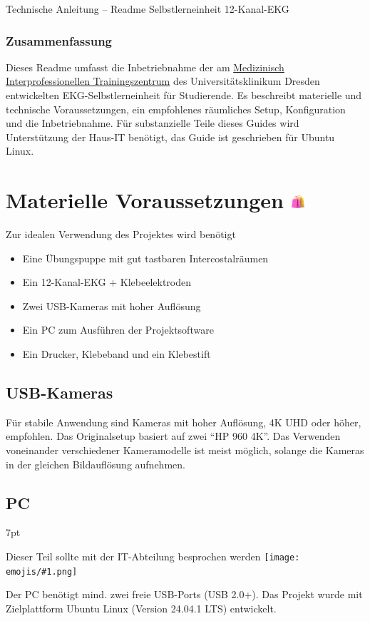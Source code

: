 \documentclass[a4paper, 10pt]{article}
\newcommand{\emoji}[1]{
    \begingroup\normalfont
    \texttt{[image: emojis/\#1.png]}
    \endgroup
}
\newenvironment{tooltip}{%
\small
\vspace*{-4mm}
    \def\FrameCommand{%
    \hspace{1pt}%
    {\color{tooltippipe}\vrule width 0.7mm}%
    {\color{tooltipshade}\vrule width 1.5mm}%
    \colorbox{tooltipshade}%
    }%
    \MakeFramed{\advance\hsize-\width\FrameRestore}%
    \noindent%
    \begin{adjustwidth}{}{7pt}%
    \vspace{2pt}\vspace{2pt}%
}
{%
    \vspace{2pt}\end{adjustwidth}\endMakeFramed%
}
\begin{document}
{ \Huge \noindent Technische Anleitung -- Readme} \newline
{ \LARGE \noindent Selbstlerneinheit 12-Kanal-EKG}

\subsubsection*{Zusammenfassung}
Dieses Readme umfasst die Inbetriebnahme der am \href{https://tu-dresden.de/med/mf/mitz}{Medizinisch Interprofessionellen Trainingszentrum} des Universitätsklinikum Dresden entwickelten EKG-Selbstlerneinheit für Studierende. Es beschreibt materielle und technische Voraussetzungen, ein empfohlenes räumliches Setup, Konfiguration und die Inbetriebnahme.
Für substanzielle Teile dieses Guides wird Unterstützung der Haus-IT benötigt, das Guide ist geschrieben für Ubuntu Linux.

\section{Materielle Voraussetzungen {\includegraphics[height=0.65em]{emojis/shopping-bags.png}}}
\label{sec:prerequisites}
Zur idealen Verwendung des Projektes wird benötigt
\begin{itemize}
    \item Eine Übungspuppe mit gut tastbaren Intercostalräumen
    \item Ein 12-Kanal-EKG + Klebeelektroden
    \item Zwei USB-Kameras mit hoher Auflösung
    \item Ein PC zum Ausführen der Projektsoftware
    \item Ein Drucker, Klebeband und ein Klebestift
\end{itemize}

\subsection{USB-Kameras}
\label{ssec:cameras}
Für stabile Anwendung sind Kameras mit hoher Auflösung, 4K UHD oder höher, empfohlen. Das Originalsetup basiert auf zwei \enquote{HP 960 4K}. Das Verwenden voneinander verschiedener Kameramodelle ist meist möglich, solange die Kameras in der gleichen Bildauflösung aufnehmen.


\subsection{PC}
\label{ssec:pc-reqs}
\begin{tooltip}
    Dieser Teil sollte mit der IT-Abteilung besprochen werden\emoji{technologist}
\end{tooltip}
Der PC benötigt mind. zwei freie USB-Ports (USB 2.0+). Das Projekt wurde mit Zielplattform Ubuntu Linux (Version 24.04.1 LTS) entwickelt.
\end{document}
